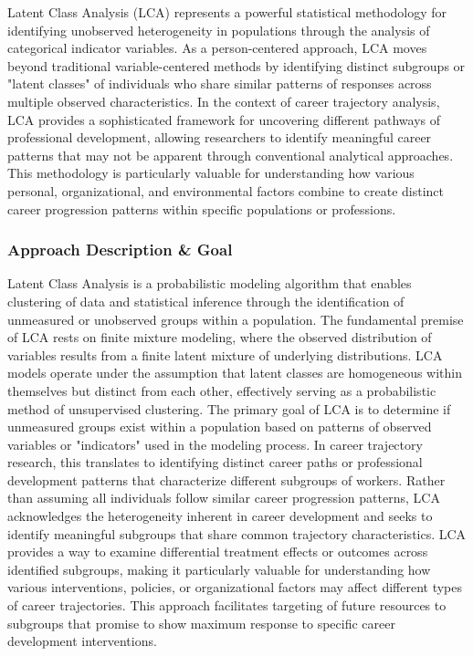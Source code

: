 \documentclass[main.tex]{subfiles}
\begin{document}
Latent Class Analysis (LCA) represents a powerful statistical methodology for identifying unobserved heterogeneity in populations through the analysis of categorical indicator variables. As a person-centered approach, LCA moves beyond traditional variable-centered methods by identifying distinct subgroups or "latent classes" of individuals who share similar patterns of responses across multiple observed characteristics. In the context of career trajectory analysis, LCA provides a sophisticated framework for uncovering different pathways of professional development, allowing researchers to identify meaningful career patterns that may not be apparent through conventional analytical approaches. This methodology is particularly valuable for understanding how various personal, organizational, and environmental factors combine to create distinct career progression patterns within specific populations or professions.
\subsubsection{Approach Description \& Goal}
Latent Class Analysis is a probabilistic modeling algorithm that enables clustering of data and statistical inference through the identification of unmeasured or unobserved groups within a population\parencite{collins2021}. The fundamental premise of LCA rests on finite mixture modeling, where the observed distribution of variables results from a finite latent mixture of underlying distributions\parencite{collins2021}. LCA models operate under the assumption that latent classes are homogeneous within themselves but distinct from each other, effectively serving as a probabilistic method of unsupervised clustering\parencite{collins2021}.
The primary goal of LCA is to determine if unmeasured groups exist within a population based on patterns of observed variables or "indicators" used in the modeling process\parencite{collins2021}. In career trajectory research, this translates to identifying distinct career paths or professional development patterns that characterize different subgroups of workers. Rather than assuming all individuals follow similar career progression patterns, LCA acknowledges the heterogeneity inherent in career development and seeks to identify meaningful subgroups that share common trajectory characteristics\parencite{masyn2011}.
LCA provides a way to examine differential treatment effects or outcomes across identified subgroups, making it particularly valuable for understanding how various interventions, policies, or organizational factors may affect different types of career trajectories\parencite{masyn2011}. This approach facilitates targeting of future resources to subgroups that promise to show maximum response to specific career development interventions\parencite{masyn2011}.
\end{document}
